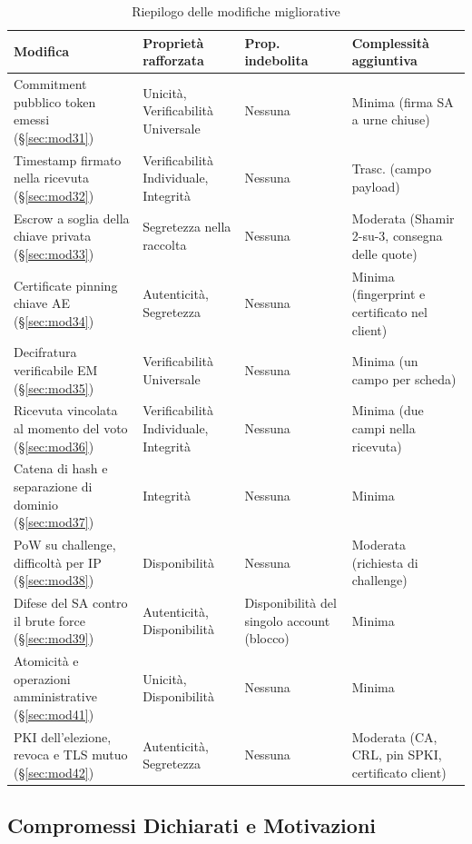 \documentclass[12pt,a4paper]{article}
\begin{document}
\begin{table}[!ht]
\centering
\footnotesize
\setlength{\tabcolsep}{3pt}
\begin{tabularx}{\textwidth}{lYYY}
\toprule
\textbf{Modifica} & \textbf{Proprietà rafforzata} & \textbf{Prop. indebolita} & \textbf{Complessità aggiuntiva} \\
\midrule
Commitment pubblico token emessi (\S\ref{sec:mod31}) & Unicità, Verificabilità Universale & Nessuna & Minima (firma SA a urne chiuse) \\
\midrule
Timestamp firmato nella ricevuta (\S\ref{sec:mod32}) & Verificabilità Individuale, Integrità & Nessuna & Trasc. (campo payload) \\
\midrule
Escrow a soglia della chiave privata (\S\ref{sec:mod33}) & Segretezza nella raccolta & Nessuna & Moderata (Shamir 2-su-3, consegna delle quote) \\
\midrule
Certificate pinning chiave AE (\S\ref{sec:mod34}) & Autenticità, Segretezza & Nessuna & Minima (fingerprint e certificato nel client) \\
\midrule
Decifratura verificabile EM (\S\ref{sec:mod35}) & Verificabilità Universale & Nessuna & Minima (un campo per scheda) \\
\midrule
Ricevuta vincolata al momento del voto (\S\ref{sec:mod36}) & Verificabilità Individuale, Integrità & Nessuna & Minima (due campi nella ricevuta) \\
\midrule
Catena di hash e separazione di dominio (\S\ref{sec:mod37}) & Integrità & Nessuna & Minima \\
\midrule
PoW su challenge, difficoltà per IP (\S\ref{sec:mod38}) & Disponibilità & Nessuna & Moderata (richiesta di challenge) \\
\midrule
Difese del SA contro il brute force (\S\ref{sec:mod39}) & Autenticità, Disponibilità & Disponibilità del singolo account (blocco) & Minima \\
\midrule
Atomicità e operazioni amministrative (\S\ref{sec:mod41}) & Unicità, Disponibilità & Nessuna & Minima \\
\midrule
PKI dell'elezione, revoca e TLS mutuo (\S\ref{sec:mod42}) & Autenticità, Segretezza & Nessuna & Moderata (CA, CRL, pin SPKI, certificato client) \\
\bottomrule
\end{tabularx}
\caption{Riepilogo delle modifiche migliorative}
\label{tab:riepilogo_modifiche}
\end{table}

\subsection{Compromessi Dichiarati e Motivazioni}
\end{document}
